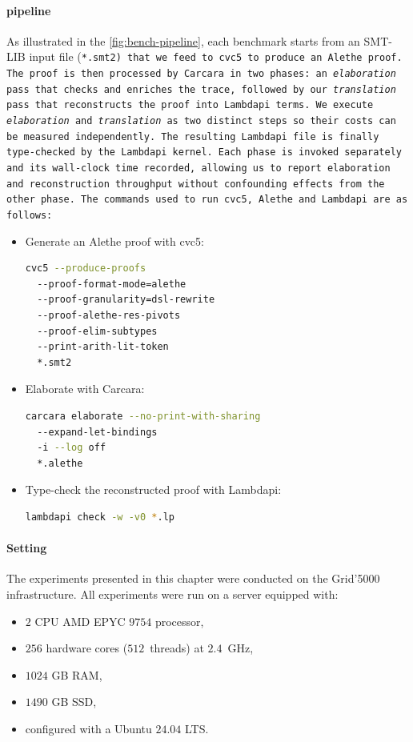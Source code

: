 \paragraph{pipeline}

As illustrated in the \cref{fig:bench-pipeline}, each benchmark starts from an SMT-LIB input file (\tt{*.smt2}) that we feed to cvc5 to produce an Alethe proof.
The proof is then processed by Carcara in two phases: an \emph{elaboration} pass that checks and enriches the trace, followed by our \emph{translation} pass that reconstructs the proof into Lambdapi terms.
We execute \emph{elaboration} and \emph{translation} as two distinct steps so their costs can be measured independently.
The resulting Lambdapi file is finally type-checked by the Lambdapi kernel.
Each phase is invoked separately and its wall-clock time recorded, allowing us to report elaboration and reconstruction throughput without confounding effects from the other phase.
The commands used to run cvc5, Alethe and Lambdapi are as follows:

\begin{itemize}
\item Generate an Alethe proof with cvc5:
\begin{lstlisting}[language=bash,numbers=none]
cvc5 --produce-proofs
  --proof-format-mode=alethe
  --proof-granularity=dsl-rewrite
  --proof-alethe-res-pivots
  --proof-elim-subtypes
  --print-arith-lit-token
  *.smt2
\end{lstlisting}

\item Elaborate with Carcara:
\begin{lstlisting}[language=bash,numbers=none]
carcara elaborate --no-print-with-sharing
  --expand-let-bindings
  -i --log off
  *.alethe
\end{lstlisting}

\item Type-check the reconstructed proof with Lambdapi:
\begin{lstlisting}[language=bash,numbers=none]
lambdapi check -w -v0 *.lp
\end{lstlisting}
\end{itemize}

\paragraph{Setting}

The experiments presented in this chapter were conducted on the {Grid'5000} \cite{grid5000} infrastructure.
All experiments were run on a server equipped with:
\begin{itemize}
  \item $2$ CPU AMD EPYC $9754$ processor,
  \item $256$ hardware cores ($512$~threads) at $2.4$~GHz,
  \item  $1024$ GB RAM,
  \item $1490$ GB SSD,
  \item configured with a Ubuntu $24.04$ LTS.
\end{itemize}

